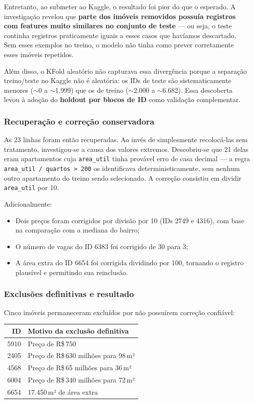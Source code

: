\documentclass[12pt,a4paper]{article}
\begin{document}
Entretanto, ao submeter ao Kaggle, o resultado foi pior do que o esperado. A investigação revelou que \textbf{parte dos imóveis removidos possuía registros com features muito similares no conjunto de teste} --- ou seja, o teste continha registros praticamente iguais a esses casos que havíamos descartado. Sem esses exemplos no treino, o modelo não tinha como prever corretamente esses imóveis repetidos.

Além disso, o KFold aleatório não capturava essa divergência porque a separação treino/teste no Kaggle não é aleatória: os IDs de teste são sistematicamente menores ($\sim$0 a $\sim$1.999) que os de treino ($\sim$2.000 a $\sim$6.682). Essa descoberta levou à adoção do \textbf{holdout por blocos de ID} como validação complementar.

\subsubsection{Recuperação e correção conservadora}

As 23 linhas foram então recuperadas. Ao invés de simplesmente recolocá-las sem tratamento, investigou-se a causa dos valores extremos. Descobriu-se que 21 delas eram apartamentos cuja \texttt{area\_util} tinha provável erro de casa decimal --- a regra \lstinline{area_util / quartos > 200} os identificava deterministicamente, sem nenhum outro apartamento do treino sendo selecionado. A correção consistiu em dividir \texttt{area\_util} por 10.

Adicionalmente:

\begin{itemize}
  \item Dois preços foram corrigidos por divisão por 10 (IDs 2749 e 4316), com base na comparação com a mediana do bairro;
  \item O número de vagas do ID 6383 foi corrigido de 30 para 3;
  \item A área extra do ID 6654 foi corrigida dividindo por 100, tornando o registro plausível e permitindo sua reinclusão.
\end{itemize}

\subsubsection{Exclusões definitivas e resultado}

Cinco imóveis permaneceram excluídos por não possuírem correção confiável:

\begin{table}[h]
\centering
\begin{tabular}{rl}
\toprule
\textbf{ID} & \textbf{Motivo da exclusão definitiva} \\
\midrule
5910 & Preço de R\$\,750 \\
2405 & Preço de R\$\,630 milhões para 98\,m² \\
4568 & Preço de R\$\,65 milhões para 36\,m² \\
6004 & Preço de R\$\,340 milhões para 72\,m² \\
6654 & 17.450\,m² de área extra \\
\bottomrule
\end{tabular}
\end{table}
\end{document}
